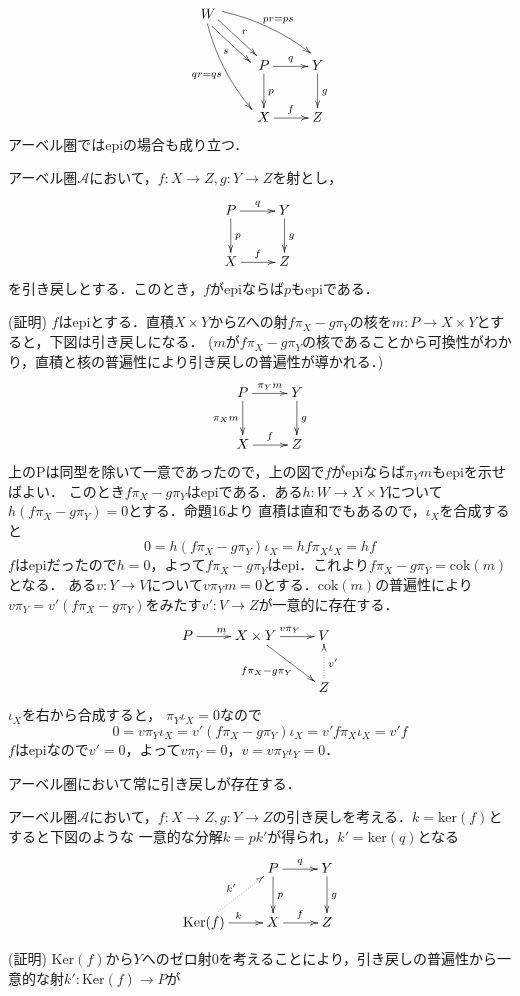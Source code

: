 \[
\xymatrix
{
W \ar@/^/@<1ex>[rrd]^{pr=ps} \ar@/_/@<-0.5ex>[rdd]_{qr=qs}  \ar@<0.5ex>[rd]^r\ar@<-1ex>[rd]_s\\
&	P \ar[d]^{p} \ar[r]^{q} 	& Y \ar[d]^g\\
&	X \ar[r]^{f}			& Z
}
\]
\proofend
アーベル圏ではepiの場合も成り立つ．
\begin{prop}
アーベル圏$\mathcal{A}$において，$f:X \to Z, g:Y \to Z$を射とし，
\[
\xymatrix
{
P \ar[r]^{q} \ar[d]^{p} 	& Y \ar[d]^g\\
X \ar[r]^{f}			& Z
}
\]
を引き戻しとする．このとき，$f$がepiならば$p$もepiである．
\end{prop}
(証明)
$f$はepiとする．直積$X \times Y$からZへの射$ f \pi_X - g  \pi_Y$の核を$m:P \to X \times Y$とすると，下図は引き戻しになる．
($m$が$f \pi_X - g  \pi_Y$の核であることから可換性がわかり，直積と核の普遍性により引き戻しの普遍性が導かれる．)
\[
\xymatrix
{
P \ar[r]^{\pi_Y m} \ar[d]_{\pi_X m} 	& Y \ar[d]^g\\
X \ar[r]^{f}			& Z
}
\]
上のPは同型を除いて一意であったので，上の図で$f$がepiならば$\pi_Y m$もepiを示せばよい．
このとき$f \pi_X - g  \pi_Y$はepiである．ある$h:W \to X \times Y$について$h(f \pi_X - g  \pi_Y) = 0$とする．命題16より
直積は直和でもあるので，$\iota_X$を合成すると
\[
	0 = h(f \pi_X - g  \pi_Y)\iota_X = hf \pi_X \iota_X =hf
\]
$f$はepiだったので$h=0$，よって$f \pi_X - g  \pi_Y$はepi．これより$f \pi_X - g  \pi_Y = \mathrm{cok}(m)$となる．
ある$v : Y \to V$について$v \pi_Y m=0$とする．$\mathrm{cok}(m)$の普遍性により
$v\pi_Y = v'(f \pi_X - g  \pi_Y)$をみたす$v' :V \to Z$が一意的に存在する．
\[
\xymatrix
{
P\ar[r]^m &X \times Y \ar[rd]_{f \pi_X - g  \pi_Y} \ar[r]^{v\pi_Y} & V \\
&&Z  \ar@{.>}[u]_{v'}
}
\]
$\iota_X$を右から合成すると，
$\pi_Y\iota_X=0$なので
\[
	0 = v\pi_Y\iota_X = v'(f \pi_X - g  \pi_Y)\iota_X = v'f\pi_X\iota_X =v'f
\]
$f$はepiなので$v'=0$，よって$v\pi_Y = 0$，$v= v\pi_Y\iota_Y=0$．
\proofend
\begin{cor}
アーベル圏において常に引き戻しが存在する．
\end{cor}
\proofend
\begin{prop}
アーベル圏$\mathcal{A}$において，$f:X \to Z, g:Y \to Z$の引き戻しを考える．$k=\mathrm{ker}(f)$とすると下図のような
一意的な分解$k = pk'$が得られ，$k'=\mathrm{ker}(q)$となる
\[
\xymatrix
{
								&P \ar[r]^{q} \ar[d]^{p} 	& Y \ar[d]^g\\
\mathrm{Ker}(f)\ar[r]^k \ar@{.>}[ru]^{k'}	&X \ar[r]^{f}			& Z
}
\]
\end{prop}
(証明)
$\mathrm{Ker}(f)$から$Y$へのゼロ射$0$を考えることにより，引き戻しの普遍性から一意的な射$k':\mathrm{Ker}(f)\to P$が
